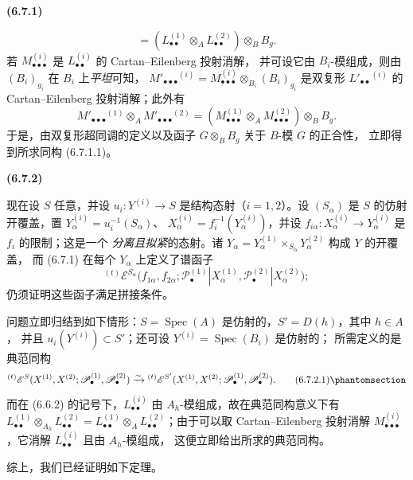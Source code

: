 \documentclass[UTF8,fontset=none,11pt,oneside,openany]{ctexbook}
\newenvironment{env}[1][]{%
  \par\medskip\noindent\textbf{(#1)}\ %
}{\par}
\let\EGAOriginalLabel\label
\renewcommand{\label}[1]{\phantomsection\EGAOriginalLabel{#1}}
\begin{document}
\begin{env}[6.7.1]
\[  =(L_{\bullet\bullet}^{(1)}\otimes_A L_{\bullet\bullet}^{(2)})
    \otimes_B B_g.
\]
若 $M_{\bullet\bullet\bullet}^{(i)}$ 是 $L_{\bullet\bullet}^{(i)}$ 的 Cartan--Eilenberg 投射消解，
并可设它由 $B_i$-模组成，则由 $(B_i)_{g_i}$ 在 $B_i$ 上\emph{平坦}可知，
$M'_{\bullet\bullet\bullet}{}^{(i)}
=M_{\bullet\bullet\bullet}^{(i)}\otimes_{B_i}(B_i)_{g_i}$ 是双复形
$L'_{\bullet\bullet}{}^{(i)}$ 的 Cartan--Eilenberg 投射消解；此外有
\[
  M'_{\bullet\bullet\bullet}{}^{(1)}\otimes_A M'_{\bullet\bullet\bullet}{}^{(2)}
  =(M_{\bullet\bullet\bullet}^{(1)}\otimes_A M_{\bullet\bullet\bullet}^{(2)})
    \otimes_B B_g.
\]
于是，由双复形超同调的定义以及函子 $G\otimes_B B_g$ 关于 $B$-模 $G$ 的正合性，
立即得到所求同构 (6.7.1.1)。
\end{env}

\begin{env}[6.7.2]
现在设 $S$ 任意，并设 $u_i:Y^{(i)}\to S$ 是结构态射（$i=1,2$）。设 $(S_\alpha)$ 是
$S$ 的仿射开覆盖，置 $Y_\alpha^{(i)}=u_i^{-1}(S_\alpha)$、
$X_\alpha^{(i)}=f_i^{-1}(Y_\alpha^{(i)})$，并设
$f_{i\alpha}:X_\alpha^{(i)}\to Y_\alpha^{(i)}$ 是 $f_i$ 的限制；这是一个
\emph{分离且拟紧}的态射。诸
$Y_\alpha=Y_\alpha^{(1)}\times_{S_\alpha}Y_\alpha^{(2)}$ 构成 $Y$ 的开覆盖，
而 (6.7.1) 在每个 $Y_\alpha$ 上定义了谱函子
\[
  {}^{(t)}\mathscr E^{S_\alpha}
  \bigl(f_{1\alpha},f_{2\alpha};
    \mathscr P_\bullet^{(1)}|X_\alpha^{(1)},
    \mathscr P_\bullet^{(2)}|X_\alpha^{(2)}\bigr);
\]
仍须证明这些函子满足拼接条件。

问题立即归结到如下情形：$S=\operatorname{Spec}(A)$ 是仿射的，$S'=D(h)$，其中 $h\in A$，
并且 $u_i(Y^{(i)})\subset S'$；还可设 $Y^{(i)}=\operatorname{Spec}(B_i)$ 是仿射的；
所需定义的是典范同构
\[
  {}^{(t)}\mathscr E^S
  (X^{(1)},X^{(2)};
   \mathscr P_\bullet^{(1)},\mathscr P_\bullet^{(2)})
  \xrightarrow{\sim}
  {}^{(t)}\mathscr E^{S'}
  (X^{(1)},X^{(2)};
   \mathscr P_\bullet^{(1)},\mathscr P_\bullet^{(2)}).
  \tag{6.7.2.1}\label{III.6.7.2.1.fr}
\]
而在 (6.6.2) 的记号下，$L_{\bullet\bullet}^{(i)}$ 由 $A_h$-模组成，故在典范同构意义下有
$L_{\bullet\bullet}^{(1)}\otimes_{A_h}L_{\bullet\bullet}^{(2)}
=L_{\bullet\bullet}^{(1)}\otimes_A L_{\bullet\bullet}^{(2)}$；由于可以取 Cartan--Eilenberg 投射消解
$M_{\bullet\bullet\bullet}^{(i)}$，它消解 $L_{\bullet\bullet}^{(i)}$ 且由 $A_h$-模组成，
这便立即给出所求的典范同构。
\end{env}

综上，我们已经证明如下定理。
\end{document}
